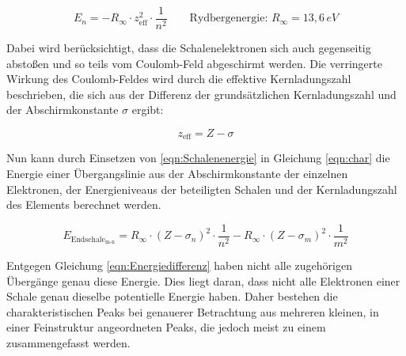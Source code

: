 \documentclass[titlepage = firstcover]{scrartcl}
\begin{document}
                \begin{equation}
                  E_n = -R_{\infty} \cdot z_{\text{eff}}^2 \cdot \frac{1}{n^2} \qquad \text{Rydbergenergie}: \, R_{\infty}=13,6 \, eV
                  \label{eqn:Schalenenergie}
                \end{equation}
                
                \noindent
                Dabei wird berücksichtigt, dass die Schalenelektronen sich auch gegenseitig abstoßen und so teils vom Coulomb-Feld abgeschirmt werden. Die verringerte Wirkung des Coulomb-Feldes
                wird durch die effektive Kernladungszahl beschrieben, die sich aus der Differenz der grundsätzlichen Kernladungszahl und der Abschirmkonstante $\sigma$ ergibt:
                
                \begin{equation*}
                  z_{\text{eff}} = Z - \sigma
                \end{equation*}
                
                \noindent
                Nun kann durch Einsetzen von \ref{eqn:Schalenenergie} in Gleichung \ref{eqn:char} die Energie einer Übergangslinie aus der Abschirmkonstante der einzelnen Elektronen, der 
                Energieniveaus der beteiligten Schalen und der Kernladungszahl des Elements berechnet werden.
                
                \begin{equation}
                  E_{\text{Endschale}_{\text{m-n}}} = R_{\infty} \cdot (Z - \sigma_n)^2 \cdot \frac{1}{n^2} - R_{\infty} \cdot (Z - \sigma_m)^2 \cdot \frac{1}{m^2}
                  \label{eqn:Energiedifferenz} 
                \end{equation}
                
                \noindent
                Entgegen Gleichung \ref{eqn:Energiedifferenz} haben nicht alle zugehörigen Übergänge genau diese Energie. Dies liegt daran, dass nicht alle Elektronen einer Schale genau dieselbe
                potentielle Energie haben. Daher bestehen die charakteristischen Peaks bei genauerer Betrachtung aus mehreren kleinen, in einer Feinstruktur angeordneten Peaks, die jedoch meist zu 
                einem zusammengefasst werden.
\end{document}
